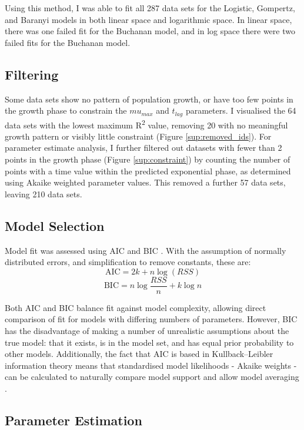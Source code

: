 \documentclass[11pt, a4paper]{article}
\begin{document}
\begin{linenumbers}
Using this method, I was able to fit all 287 data sets for the Logistic, Gompertz, and Baranyi models in both linear space and logarithmic space. In linear space, there was one failed fit for the Buchanan model, and in log space there were two failed fits for the Buchanan model.


\subsection{Filtering}
Some data sets show no pattern of population growth, or have too few points in the growth phase to constrain the $mu_{max}$ and $t_{lag}$ parameters. I visualised the 64 data sets with the lowest maximum R\textsuperscript{2} value, removing 20 with no meaningful growth pattern or visibly little constraint (Figure \ref{sup:removed_ids}). For parameter estimate analysis, I further filtered out datasets with fewer than 2 points in the growth phase (Figure \ref{sup:constraint}) by counting the number of points with a time value within the predicted exponential phase, as determined using Akaike weighted parameter values. This removed a further 57 data sets, leaving 210 data sets.


\subsection{Model Selection}

Model fit was assessed using AIC \cite{AIC} and BIC \cite{BIC}. With the assumption of normally distributed errors, and simplification to remove constants, these are:
\[\text {AIC}  = 2k + n\log(RSS)\]
\[\text {BIC} = n\log{\frac{RSS}{n}} + k\log{n}\]


Both AIC and BIC balance fit against model complexity, allowing direct comparison of fit for models with differing numbers of parameters. However, BIC has the disadvantage of making a number of unrealistic assumptions about the true model: that it exists, is in the model set, and has equal prior probability to other models. Additionally, the fact that AIC is based in Kullback–Leibler information theory means that standardised model likelihoods - Akaike weights - can be calculated to naturally compare model support and allow model averaging \cite{Omland, ModelSelection}.


\subsection{Parameter Estimation}


\end{linenumbers}
\end{document}
